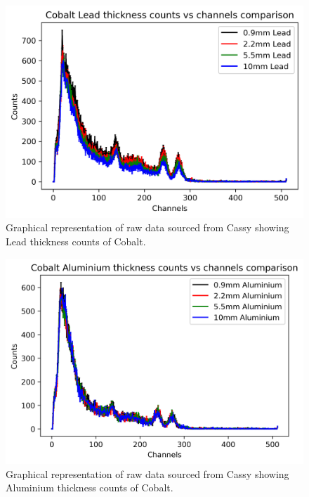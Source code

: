 \documentclass[12pt]{article}
\begin{document}
\begin{multicols}{2}
\begin{figure}[H]
\centering
\includegraphics[scale=0.6]{Images/CobaltLeadCounts.png}
\caption{Graphical representation of raw data sourced from Cassy showing Lead thickness counts of Cobalt.}
\label{Cobalt Lead Counts}
\end{figure}

\begin{figure}[H]
\centering
\includegraphics[scale=0.6]{Images/CobaltAluminiumCounts.png}
\caption{Graphical representation of raw data sourced from Cassy showing Aluminium thickness counts of Cobalt.}
\label{Cobalt Alu Counts}
\end{figure}
\end{multicols}
\newpage
\end{document}
